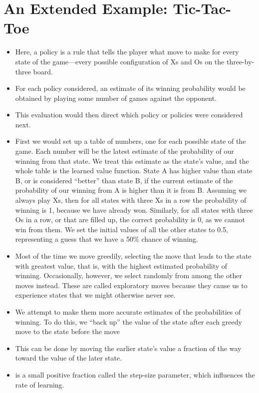 \documentclass{article}
\begin{document}
\section{An Extended Example: Tic-Tac-Toe}
\begin{itemize}
    \item Here, a policy is a rule that tells the player what move to make for every state of the game—every possible configuration of Xs and Os on the three-by-three board.
    \item For each policy considered, an estimate of its winning probability would be obtained by playing some number of games against the opponent.
    \item This evaluation would then direct which policy or policies were considered next.
    \item First we would set up a table of numbers, one for each possible state of the game. Each number will be the latest estimate of the probability of our winning from that state. We treat this estimate as the state’s value, and the whole table is the learned value function. State A has higher value than state B, or is considered “better” than state B, if the current estimate of the probability of our winning from A is higher than it is from B. Assuming we always play Xs, then for all states with three Xs in a row the probability of winning is 1, because we have already won. Similarly, for all states with three Os in a row, or that are filled up, the correct probability is 0, as we cannot win from them. We set the initial values of all the other states to 0.5, representing a guess that we have a 50\% chance of winning.
    \item Most of the time we move greedily, selecting the move that leads to the state with greatest value, that is, with the highest estimated probability of winning. Occasionally, however, we select randomly from among the other moves instead. These are called exploratory moves because they cause us to experience states that we might otherwise never see.
    \item We attempt to make them more accurate estimates of the probabilities of winning. To do this, we “back up” the value of the state after each greedy move to the state before the move
    \item This can be done by moving the earlier state's value a fraction of the way toward the value of the later state.
    \item \textalpha \thickspace is a small positive fraction called the step-size parameter, which influences the rate of learning.

\end{itemize}
\end{document}
